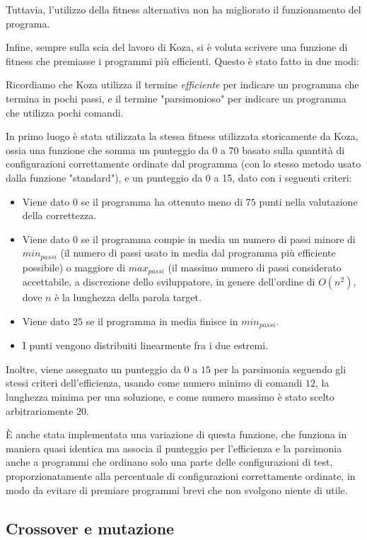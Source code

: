 \documentclass[paper=a4, fontsize=11pt]{scrartcl}
\numberwithin{equation}{section}		%
\numberwithin{figure}{section}			%
\numberwithin{table}{section}				%
\begin{document}
Tuttavia, l'utilizzo della fitness alternativa non ha migliorato il funzionamento del programa.

Infine, sempre sulla scia del lavoro di Koza, si è voluta scrivere una funzione di fitness che premiasse i programmi più efficienti. Questo è stato fatto in due modi:


Ricordiamo che Koza utilizza il termine \emph{efficiente} per indicare un programma che termina in pochi passi, e il termine "parsimonioso" per indicare un programma che utilizza pochi comandi.

In primo luogo è stata utilizzata la stessa fitness utilizzata storicamente da Koza, ossia una funzione che somma un punteggio da 0 a 70 basato sulla quantità di configurazioni correttamente ordinate dal programma (con lo stesso metodo usato dalla funzione "standard"),   e un punteggio da 0 a 15, dato con i seguenti criteri:
\begin{itemize}
\item Viene dato $0$ se il programma ha ottenuto meno di $75$ punti nella valutazione della correttezza.
\item Viene dato $0$ se il programma compie in media un numero di passi minore di $min_{passi}$ (il numero di passi usato in media dal programma più efficiente possibile) o maggiore di $max_{passi}$ (il massimo numero di passi considerato accettabile, a discrezione dello sviluppatore, in genere dell'ordine di $O(n^2)$, dove $n$ è la lunghezza della parola target.
\item Viene dato $25$ se il programma in media finisce in $min_{passi}$.
\item I punti vengono distribuiti linearmente fra i due estremi.
\end{itemize}

Inoltre, viene assegnato un punteggio da $0$ a $15$ per la parsimonia seguendo gli stessi criteri dell'efficienza, usando come numero minimo di comandi $12$, la lunghezza minima per una soluzione, e come numero massimo è stato scelto arbitrariamente $20$.

È anche stata implementata una variazione di questa funzione, che funziona in maniera quasi identica ma associa il punteggio per l'efficienza e la parsimonia anche a programmi che ordinano solo una parte delle configurazioni di test, proporzionatamente alla percentuale di configurazioni correttamente ordinate, in modo da evitare di premiare programmi brevi che non svolgono niente di utile.

\subsection{Crossover e mutazione}
\end{document}
